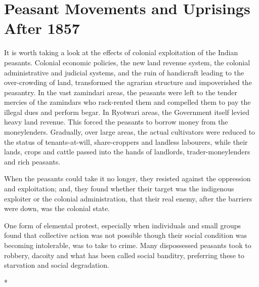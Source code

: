 \cleardoublepage
\chapter{Peasant Movements and Uprisings After 1857}

It is worth taking a look at the effects of colonial exploitation of the Indian peasants. Colonial economic policies, the new land revenue system, the colonial administrative and judicial systems, and the ruin of handicraft leading to the over-crowding of land, transformed the agrarian structure and impoverished the peasantry. In the vast zamindari areas, the peasants were left to the tender mercies of the zamindars who rack-rented them and compelled them to pay the illegal dues and perform begar. In Ryotwari areas, the Government itself levied heavy land revenue. This forced the peasants to borrow money from the moneylenders. Gradually, over large areas, the actual cultivators were reduced to the status of tenants-at-will, share-croppers and landless labourers, while their lands, crops and cattle passed into the hands of landlords, trader-moneylenders and rich peasants.

When the peasants could take it no longer, they resisted against the oppression and exploitation; and, they found whether their target was the indigenous exploiter or the colonial administration, that their real enemy, after the barriers were down, was the colonial state.

One form of elemental protest, especially when individuals and small groups found that collective action was not possible though their social condition was becoming intolerable, was to take to crime. Many dispossessed peasants took to robbery, dacoity and what has been called social banditry, preferring these to starvation and social degradation.

\begin{center}*\end{center}

